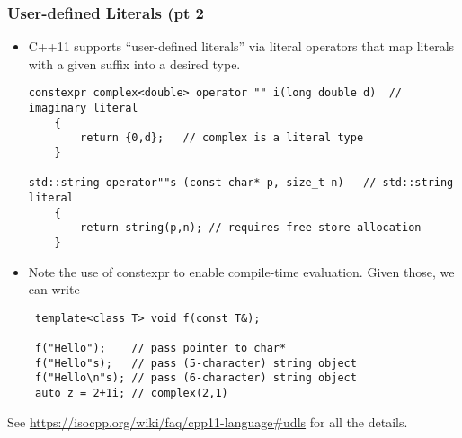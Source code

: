 \begin{frame}[fragile,t]
\frametitle{User-defined Literals (pt 2}
\begin{itemize}[<+->]
\item C++11 supports ``user-defined literals'' via literal operators
  that map literals with a given suffix into a desired type.
{\scriptsize\begin{verbatim}
constexpr complex<double> operator "" i(long double d)  // imaginary literal
    {
        return {0,d};   // complex is a literal type
    }

std::string operator""s (const char* p, size_t n)   // std::string literal
    {
        return string(p,n); // requires free store allocation
    }
\end{verbatim}
}

\item Note the use of constexpr to enable compile-time evaluation. Given those, we can write
{\scriptsize\begin{verbatim}
 template<class T> void f(const T&);

 f("Hello");    // pass pointer to char*
 f("Hello"s);   // pass (5-character) string object
 f("Hello\n"s); // pass (6-character) string object
 auto z = 2+1i; // complex(2,1)
\end{verbatim}
}
\end{itemize}

\vskip 12pt
\pause
See \url{https://isocpp.org/wiki/faq/cpp11-language#udls} for all the details.

\end{frame}



